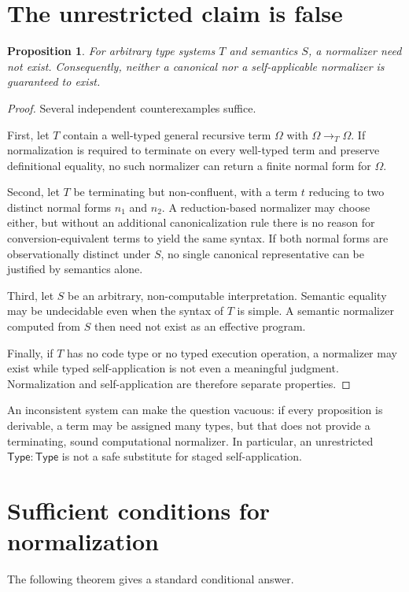 \documentclass[11pt,a4paper]{article}
\newtheorem{proposition}[theorem]{Proposition}
\newcommand{\Ty}{\mathsf{Type}}
\begin{document}
\section{The unrestricted claim is false}
\begin{proposition}
For arbitrary type systems $T$ and semantics $S$, a normalizer need not exist. Consequently, neither a canonical nor a self-applicable normalizer is guaranteed to exist.
\end{proposition}
\begin{proof}
Several independent counterexamples suffice.

First, let $T$ contain a well-typed general recursive term $\Omega$ with $\Omega\to_T\Omega$. If normalization is required to terminate on every well-typed term and preserve definitional equality, no such normalizer can return a finite normal form for $\Omega$.

Second, let $T$ be terminating but non-confluent, with a term $t$ reducing to two distinct normal forms $n_1$ and $n_2$. A reduction-based normalizer may choose either, but without an additional canonicalization rule there is no reason for conversion-equivalent terms to yield the same syntax. If both normal forms are observationally distinct under $S$, no single canonical representative can be justified by semantics alone.

Third, let $S$ be an arbitrary, non-computable interpretation. Semantic equality may be undecidable even when the syntax of $T$ is simple. A semantic normalizer computed from $S$ then need not exist as an effective program.

Finally, if $T$ has no code type or no typed execution operation, a normalizer may exist while typed self-application is not even a meaningful judgment. Normalization and self-application are therefore separate properties.
\end{proof}

An inconsistent system can make the question vacuous: if every proposition is derivable, a term may be assigned many types, but that does not provide a terminating, sound computational normalizer. In particular, an unrestricted $\Ty:\Ty$ is not a safe substitute for staged self-application.

\section{Sufficient conditions for normalization}
The following theorem gives a standard conditional answer.
\end{document}
